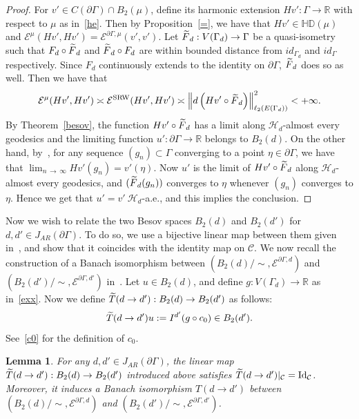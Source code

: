 \documentclass[10pt]{amsart}
\newtheorem{lemm}[theo]{Lemma}\newtheorem{prop}[theo]{Proposition}\newtheorem{coro}[theo]{Corollary}\newtheorem{conj}[theo]{Conjecture}
\theoremstyle{definition}\newtheorem{defi}[theo]{Definition}\newtheorem{rema}[theo]{Remark}\newtheorem{exam}[theo]{Example}\newtheorem{exem}[theo]{Example}\newtheorem{nota}[theo]{Notation}
\newcommand{\ce}{\mathcal{E}}
\newcommand{\ch}{\mathcal{H}}
\newcommand{\cC}{\mathcal{C}}
\newcommand{\br}{\mathbb{R}}
\newcommand{\bHD}{\mathbb{HD}}
\newcommand{\SRW}{\mathrm{SRW}}
\newcommand{\rmId}{\mathrm{Id}}
\let\oldtilde\tilde
\renewcommand*{\tilde}[1]{\mathchoice{\widetilde{#1}}{\widetilde{#1}}{\oldtilde{#1}}{\oldtilde{#1}}}
\begin{document}
\begin{proof}
For $v'\in C(\partial\Gamma)\cap B_2(\mu)$, define its harmonic extension $Hv':\Gamma\rightarrow\br$ with respect to $\mu$ as in~\eqref{he}. Then by Proposition~\ref{=}, we have that $Hv'\in\bHD(\mu)$ and $\ce^{\mu}(Hv',Hv')=\ce^{\partial\Gamma,\mu}(v',v')$. Let $\tilde{F}_{d}:V(\Gamma_{d})\rightarrow\Gamma$ be a quasi-isometry such that $F_{d}\circ\tilde{F}_{d}$ and $\tilde{F}_{d}\circ F_{d}$ are within bounded distance from $id_{\Gamma_{d}}$ and $id_{\Gamma}$ respectively. Since $F_{d}$ continuously extends to the identity on $\partial\Gamma$, $\tilde{F}_{d}$ does so as well. Then we have that
\begin{align*}
\ce^{\mu}(Hv',Hv')\asymp \ce^{\SRW}(Hv',Hv')\asymp
\left\|d\left(Hv'\circ \tilde{F}_{d}\right)\right\|^2_{\ell_2(E(\Gamma_{d}))}<+\infty.
\end{align*}
By Theorem~\ref{besov}, the function $Hv'\circ \tilde{F}_{d}$ has a limit along $\ch_{d}$-almost every geodesics and the limiting function $u':\partial \Gamma\rightarrow\br$ belongs to $B_2(d)$. On the other hand, by~\cite[Lemma~2.2]{Ka}, for any sequence $(g_n)\subset\Gamma$ converging to a point $\eta\in\partial\Gamma$, we have that $\lim_{n\,\to\,\infty}Hv'(g_n)=v'(\eta)$. Now $u'$ is the limit of $Hv'\circ \tilde{F}_{d}$ along $\ch_{d}$-almost every geodesics, and $(\tilde{F}_{d}(g_n))$ converges to $\eta$ whenever $(g_n)$ converges to $\eta$. Hence we get that $u'=v'\ \ch_{d}$-a.e., and this implies the conclusion.
\end{proof}

Now we wish to relate the two Besov spaces $B_2(d)$ and $B_2(d')$ for $d,d'\in J_{AR}(\partial\Gamma)$. To do so, we use a bijective linear map between them given in~\cite{BP}, and show that it coincides with the identity map on $\cC$. We now recall the construction of a Banach isomorphism between $(B_2(d)/\sim,\ce^{\partial\Gamma,d})$ and $(B_2(d')/\sim,\ce^{\partial\Gamma,d'})$ in~\cite{BP}. Let $u\in B_2(d)$, and define $g:V(\Gamma_{d})\rightarrow\br$ as in~\eqref{exx}. Now we define $\tilde{T}(d\to d'):B_2(d)
\rightarrow B_2(d')
$ as follows:
\[
\tilde{T}(d\to d')u:=I^{d'}(g\circ c_0)\in B_2(d').
\]
See~\eqref{c0} for the definition of $c_0$.

\begin{lemm}\label{nap}
For any $d,d'\in J_{AR}(\partial\Gamma)$, the linear map $\tilde{T}(d\to d'):B_2(d) \to B_2(d')$ introduced above satisfies $\tilde{T}(d\to d')|_{\cC}=\rmId_{\cC}$. Moreover, it induces a Banach isomorphism $T(d\to d')$ between $(B_2(d)/\sim,\ce^{\partial\Gamma,d})$ and $(B_2(d')/\sim,\ce^{\partial\Gamma,d'})$.
\end{lemm}
\end{document}
